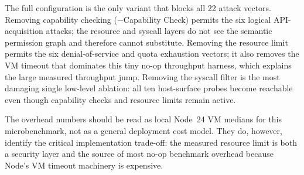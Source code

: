 \documentclass[letterpaper,twocolumn,10pt]{article}
\begin{document}
\begin{table}[t]
\centering
\caption{Ablation of Sandbox Contract components.
Escape-blocked = fraction of the 22-scenario suite caught by the sandbox
layer in this configuration (0 = none caught; 1 = all caught).
Throughput is wall-clock ops/s (median, 500 measured iterations after
50 warm-up) on the benchmark harness; higher is better.
Overhead vs.\ baseline = slowdown relative to the fully unsandboxed
(no-enforcement) execution path.}
\label{tab:ablation-sandbox}
\small
{}
\end{table}

The full configuration is the only variant that blocks all 22 attack
vectors.  Removing capability checking ($-$Capability Check) permits the
six logical API-acquisition attacks; the resource and syscall layers do
not see the semantic permission graph and therefore cannot substitute.
Removing the resource limit permits the six denial-of-service and quota
exhaustion vectors; it also removes the VM timeout that dominates this
tiny no-op throughput harness, which explains the large measured
throughput jump.  Removing the syscall filter is the most damaging
single low-level ablation: all ten host-surface probes become reachable
even though capability checks and resource limits remain active.

The overhead numbers should be read as local Node~24 VM medians for this
microbenchmark, not as a general deployment cost model.  They do,
however, identify the critical implementation trade-off: the measured
resource limit is both a security layer and the source of most no-op
benchmark overhead because Node's VM timeout machinery is expensive.
\end{document}
